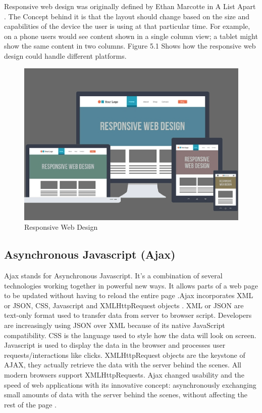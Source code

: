 Responsive web design was originally defined by Ethan Marcotte in A List Apart \cite{RWD2}. The Concept behind it is that the layout should change based on the size and capabilities of the device the user is using at that particular time. For example, on a phone users would see content shown in a single column view; a tablet might show the same content in two columns. Figure 5.1 Shows how the responsive web design could handle different platforms.
\begin{figure}[H]
\centering
\includegraphics[scale=0.5]{Images/RWD.png}
\caption[Responsive Web Design]{Responsive Web Design \cite{RWD3}}
\end{figure}
\subsection{Asynchronous Javascript (Ajax)}
Ajax stands for Asynchronous Javascript. It’s a combination of several technologies working together in powerful new ways. It allows parts of a web page to be updated without having to reload the entire page \cite{garrett2005ajax}.Ajax incorporates XML or JSON, CSS, Javascript and XMLHttpRequest objects \cite{AJAX}. XML or JSON are text-only format used to transfer data from server to browser script. Developers are increasingly using JSON over XML because of its native JavaScript compatibility. CSS is the language used to style how the data will look on screen. Javascript is used to display the data in the browser and processes user requests/interactions like clicks. XMLHttpRequest objects are the keystone of AJAX, they actually retrieve the data with the server behind the scenes. All modern browsers support XMLHttpRequests. Ajax changed usability and the speed of web applications with its innovative concept: asynchronously exchanging small amounts of data with the server behind the scenes, without affecting the rest of the page \cite{AJAX}.

